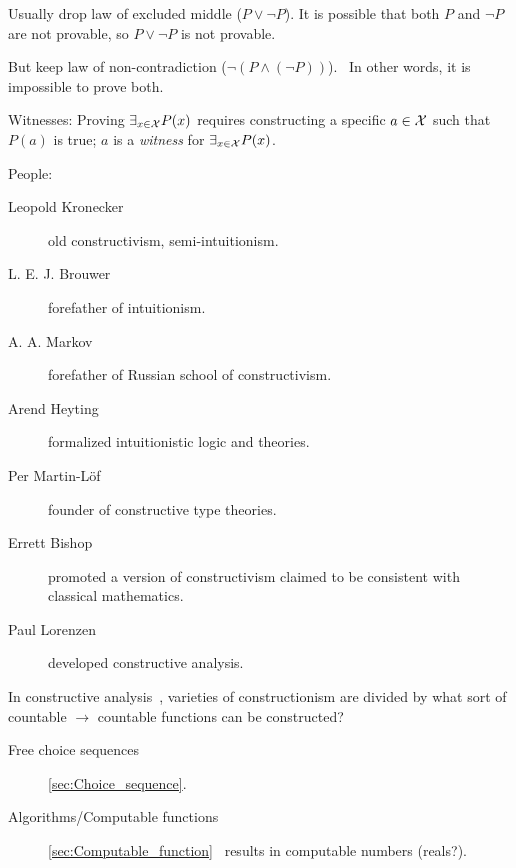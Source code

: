 \label{sec:Constructivism_Wikipedia}

\cite{wiki:Constructivism_philosophy_of_mathematics}

Usually drop law of excluded middle 
($P \vee \lnot P$).\cite{wiki:Law_of_excluded_middle}
It is possible that both $P$ and $\lnot P$ are not provable,
so $P \vee \lnot P$ is not provable.

But keep law of non-contradiction
($\lnot ( P \wedge (\lnot P))$).~\cite{wiki:Law_of_noncontradiction}
In other words, it is impossible to prove both.

Witnesses: Proving $\exists _{x\in \mathcal{X}}P(x)$ requires
constructing a specific $a \in \mathcal{X}$ such that $P(a)$ is true; 
$a$ is a \textit{witness} for $\exists _{x\in \mathcal{X}}P(x)$.

People\cite{wiki:Constructivism_philosophy_of_mathematics}:
\begin{description}
\item[Leopold Kronecker] old constructivism, semi-intuitionism.
\item[L. E. J. Brouwer] forefather of intuitionism.
\item[A. A. Markov ] forefather of Russian school of constructivism.
\item[Arend Heyting] formalized intuitionistic logic and theories.
\item[Per Martin-Löf] founder of constructive type theories.
\item[Errett Bishop] promoted a version of constructivism 
claimed to be consistent with classical mathematics.
\item[Paul Lorenzen] developed constructive analysis.
\end{description}

\label{Constructive analysis}

In constructive 
analysis~\cite{wiki:Constructive_analysis,
Bridger:2019,henle:2012:numbers},
varieties of constructionism are divided by
what sort of countable $\rightarrow$ countable functions can be 
constructed?~\cite{wiki:Constructivism_philosophy_of_mathematics}
\begin{description}
\item[Free choice sequences] 
\autoref{sec:Choice_sequence}\cite{wiki:Choice_sequence}.
\item[Algorithms/Computable functions] 
\autoref{sec:Computable_function}~\cite{wiki:Computable_function}
 results in computable numbers (reals?).
\end{description}

